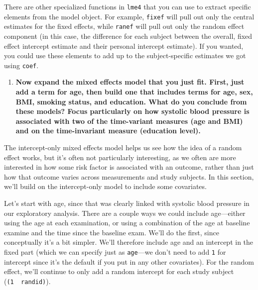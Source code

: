\documentclass[
]{book}
\newenvironment{Shaded}{\begin{snugshade}}{\end{snugshade}}
\newcommand{\DataTypeTok}[1]{\textcolor[rgb]{0.13,0.29,0.53}{#1}}
\newcommand{\DecValTok}[1]{\textcolor[rgb]{0.00,0.00,0.81}{#1}}
\newcommand{\KeywordTok}[1]{\textcolor[rgb]{0.13,0.29,0.53}{\textbf{#1}}}
\newcommand{\NormalTok}[1]{#1}
\newcommand{\OperatorTok}[1]{\textcolor[rgb]{0.81,0.36,0.00}{\textbf{#1}}}
\newcommand{\StringTok}[1]{\textcolor[rgb]{0.31,0.60,0.02}{#1}}
\providecommand{\tightlist}{%
  \setlength{\itemsep}{0pt}\setlength{\parskip}{0pt}}
\begin{document}
There are other specialized functions in \texttt{lme4} that you can use to extract
specific elements from the model object. For example, \texttt{fixef} will pull out only
the central estimates for the fixed effects, while \texttt{ranef} will pull out only
the random effect component (in this case, the difference for each subject
between the overall, fixed effect intercept estimate and their personal intercept
estimate). If you wanted, you could use these elements to add up to the
subject-specific estimates we got using \texttt{coef}.

\begin{enumerate}
\def\labelenumi{\arabic{enumi}.}
\setcounter{enumi}{2}
\tightlist
\item
  \textbf{Now expand the mixed effects model that you just fit. First, just add a
  term for age, then build one that includes terms for age, sex, BMI, smoking
  status, and education. What do you conclude from these models? Focus
  particularly on how systolic blood pressure is associated with two of the
  time-variant measures (age and BMI) and on the time-invariant measure (education
  level).}
\end{enumerate}

The intercept-only mixed effects model helps us see how the idea of a random
effect works, but it's often not particularly interesting, as we often are
more interested in how some risk factor is associated with an outcome, rather
than just how that outcome varies across measurements and study subjects.
In this section, we'll build on the intercept-only model to include some
covariates.

Let's start with age, since that was clearly linked with systolic blood pressure
in our exploratory analysis. There are a couple ways we could include
age---either using the age at each examination, or using a combination of the
age at baseline examine and the time since the baseline exam. We'll do the
first, since conceptually it's a bit simpler. We'll therefore include age and an
intercept in the fixed part (which we can specify just as \texttt{age}---we don't need
to add \texttt{1} for intercept since it's the default if you put in any other
covariates). For the random effect, we'll continue to only add a random
intercept for each study subject (\texttt{(1\ \textbar{}\ randid)}).

\begin{Shaded}
\end{Shaded}
\end{document}
